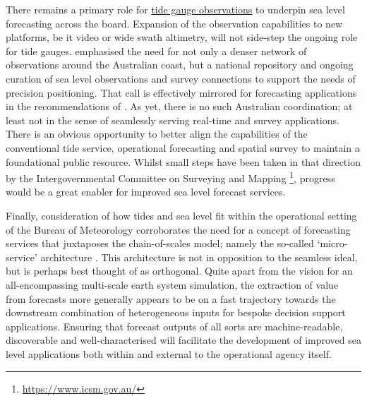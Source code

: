 There remains a primary role for \underline{tide gauge observations} to underpin sea level forecasting across the board.
Expansion of the observation capabilities to new platforms, be it video \citep{10.1175/jtech-d-18-0203.1} or wide swath altimetry, will not side-step the ongoing role for tide gauges.
\citep{Keysers:we} emphasised the need for not only a denser network of observations around the Australian coast, but a national repository and ongoing curation of sea level observations and survey connections to support the needs of precision positioning.   
That call is effectively mirrored for forecasting applications in the recommendations of \citep{10.1175/bams-89-4-459}.
As yet, there is no such Australian coordination; at least not in the sense of seamlessly serving real-time and survey applications.
There is an obvious opportunity to better align the capabilities of the conventional tide service, operational forecasting and spatial survey to maintain a foundational public resource.  Whilst small steps have been taken in that direction by the Intergovernmental Committee on Surveying and Mapping \footnote{\url{https://www.icsm.gov.au/}}, progress would be a great enabler for improved sea level forecast services.





Finally, consideration of how tides and sea level fit within the operational setting of the Bureau of Meteorology corroborates the need for a concept of forecasting services that juxtaposes the chain-of-scales model; namely the so-called `micro-service' architecture \citep{BCG2020}.   This architecture is not in opposition to the seamless ideal, but is perhaps best thought of as orthogonal.  
Quite apart from the vision for an all-encompassing multi-scale earth system simulation, the extraction of value from forecasts more generally appears to be on a fast trajectory towards the downstream combination of heterogeneous inputs for bespoke decision support applications.  
Ensuring that forecast outputs of all sorts are machine-readable, discoverable and well-characterised will facilitate the development of improved sea level applications both within and external to the operational agency itself.    




